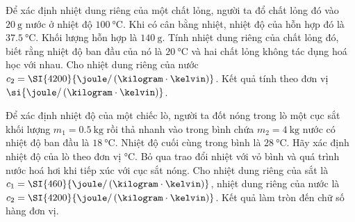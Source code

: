 \begin{ex}
Để xác định nhiệt dung riêng của một chất lỏng, người ta đổ chất lỏng đó vào $\SI{20}{\gram}$ nước ở nhiệt độ $\SI{100}{\celsius}$. Khi có cân bằng nhiệt, nhiệt độ của hỗn hợp đó là $\SI{37.5}{\celsius}$. Khối lượng hỗn hợp là $\SI{140}{\gram}$. Tính nhiệt dung riêng của chất lỏng đó, biết rằng nhiệt độ ban đầu của nó là $\SI{20}{\celsius}$ và hai chất lỏng không tác dụng hoá học với nhau. Cho nhiệt dung riêng của nước $c_2=\SI{4200}{\joule/\left(\kilogram\cdot\kelvin\right)}$. Kết quả tính theo đơn vị $\si{\joule/\left(\kilogram\cdot\kelvin\right)}$.
	
\end{ex}
\begin{ex}
	Để xác định nhiệt độ của một chiếc lò, người ta đốt nóng trong lò một cục sắt khối lượng $m_1=\SI{0.5}{\kilogram}$ rồi thả nhanh vào trong bình chứa $m_2=\SI{4}{\kilogram}$ nước có nhiệt độ ban đầu là $\SI{18}{\celsius}$. Nhiệt độ cuối cùng trong bình là $\SI{28}{\celsius}$. Hãy xác định nhiệt độ của lò theo đơn vị \si{\celsius}. Bỏ qua trao đổi nhiệt với vỏ bình và quá trình nước hoá hơi khi tiếp xúc với cục sắt nóng. Cho nhiệt dung riêng của sắt là $c_1=\SI{460}{\joule/\left(\kilogram\cdot\kelvin\right)}$, nhiệt dung riêng của nước là $c_2=\SI{4200}{\joule/\left(\kilogram\cdot\kelvin\right)}$. Kết quả làm tròn đến chữ số hàng đơn vị.
	
\end{ex}

